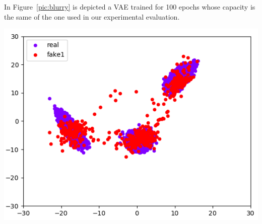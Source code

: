 \documentclass{article}
\begin{document}
In Figure~\ref{pic:blurry} is depicted a VAE trained for 100 epochs whose capacity is the same of the one used in our experimental evaluation.
\begin{minipage}{0.5\textwidth}
\center\includegraphics[scale=0.3]{pics/gmm_blurry.png}
\end{minipage}\label{pic:blurry}
\end{document}
